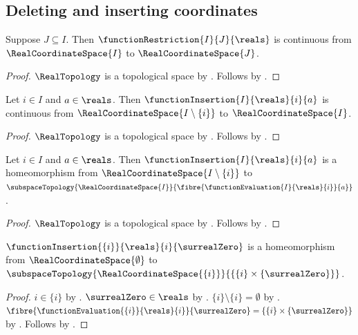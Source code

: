 \subsection{Deleting and inserting coordinates}

\begin{theorem}\label{real_coordinate_restriction_continuous}
    Suppose $J\subseteq I$.
    Then $\functionRestriction{I}{J}{\reals}$ is continuous from
        $\RealCoordinateSpace{I}$ to $\RealCoordinateSpace{J}$.
\end{theorem}
\begin{proof}
    $\RealTopology$ is a topological space by .
    Follows by .
\end{proof}

\begin{theorem}\label{real_coordinate_insertion_continuous}
    Let $i\in I$ and $a\in\reals$.
    Then $\functionInsertion{I}{\reals}{i}{a}$ is continuous from
        $\RealCoordinateSpace{I\setminus\{i\}}$ to $\RealCoordinateSpace{I}$.
\end{theorem}
\begin{proof}
    $\RealTopology$ is a topological space by .
    Follows by .
\end{proof}

\begin{theorem}\label{real_coordinate_insertion_homeomorphism}
    Let $i\in I$ and $a\in\reals$.
    Then $\functionInsertion{I}{\reals}{i}{a}$ is a homeomorphism from
        $\RealCoordinateSpace{I\setminus\{i\}}$ to
        $\subspaceTopology{\RealCoordinateSpace{I}}{
            \fibre{\functionEvaluation{I}{\reals}{i}}{a}}$.
\end{theorem}
\begin{proof}
    $\RealTopology$ is a topological space by .
    Follows by .
\end{proof}

\begin{theorem}\label{real_zero_coordinate_insertion}
    $\functionInsertion{\{i\}}{\reals}{i}{\surrealZero}$ is a homeomorphism from
        $\RealCoordinateSpace{\emptyset}$ to
        $\subspaceTopology{\RealCoordinateSpace{\{i\}}}{\{\{i\}\times\{\surrealZero\}\}}$.
\end{theorem}
\begin{proof}
    $i\in\{i\}$ by .
    $\surrealZero\in\reals$ by .
    $\{i\}\setminus\{i\}=\emptyset$ by .
    $\fibre{\functionEvaluation{\{i\}}{\reals}{i}}{\surrealZero}
        =\{\{i\}\times\{\surrealZero\}\}$ by .
    Follows by .
\end{proof}

